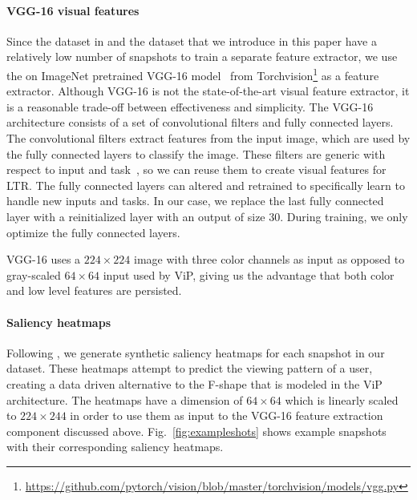 \paragraph{VGG-16 visual features}
Since the dataset in \citep{fan2017learning} and the \datasetname{} dataset that we introduce in this paper have a relatively low number of snapshots to train a separate feature extractor, we use the on ImageNet pretrained VGG-16 model~\cite{simonyan2014very} from Torchvision\footnote{\url{https://github.com/pytorch/vision/blob/master/torchvision/models/vgg.py}} as a feature extractor. Although VGG-16 is not the state-of-the-art visual feature extractor, it is a reasonable trade-off between effectiveness and simplicity.
The VGG-16 architecture consists of a set of convolutional filters and fully connected layers. The convolutional filters extract features from the input image, which are used by the fully connected layers to classify the image. 
These filters are generic with respect to input and task~\citep{donahue2014decaf}, so we can reuse them to create visual features for LTR. The fully connected layers can altered and retrained to specifically learn to handle new inputs and tasks. 
In our case, we replace the last fully connected layer with a reinitialized layer with an output of size $30$. During training, we only optimize the fully connected layers.

VGG-16 uses a $224\times224$ image with three color channels as input as opposed to gray-scaled $64\times64$ input used by ViP, giving us the advantage that both color and low level features are persisted. 


\paragraph{Saliency heatmaps}
Following \cite{shan2017two}, we generate synthetic saliency heatmaps for each snapshot in our data\-set. 
These heatmaps attempt to predict the viewing pattern of a user, creating a data driven alternative to the F-shape that is modeled in the ViP architecture. 
The heatmaps have a dimension of $64\times64$ which is linearly scaled to $224\times244$ in order to use them as input to the VGG-16 feature extraction component discussed above.
Fig.~\ref{fig:exampleshots} shows example snapshots with their corresponding saliency heatmaps.
